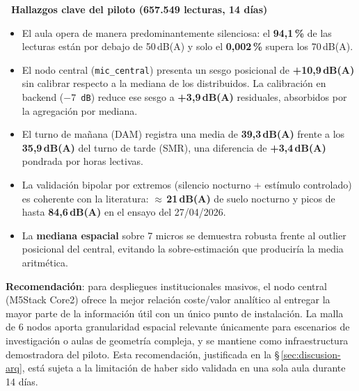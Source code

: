 \documentclass[11pt,a4paper,openany]{report}
\begin{document}
\begin{KeyFinding}
\textbf{\faChartBar\ Hallazgos clave del piloto (657.549 lecturas, 14 d\'ias)}
\begin{itemize}[leftmargin=1.2em]
    \item El aula opera de manera predominantemente silenciosa: el \textbf{94,1\,\%} de las lecturas est\'an por debajo de 50\,dB(A) y solo el \textbf{0,002\,\%} supera los 70\,dB(A).
    \item El nodo central (\texttt{mic\_central}) presenta un sesgo posicional de \textbf{+10,9\,dB(A)} sin calibrar respecto a la mediana de los distribuidos. La calibraci\'on en backend (\texttt{$-7$\,dB}) reduce ese sesgo a \textbf{+3,9\,dB(A)} residuales, absorbidos por la agregaci\'on por mediana.
    \item El turno de ma\~nana (DAM) registra una media de \textbf{39,3\,dB(A)} frente a los \textbf{35,9\,dB(A)} del turno de tarde (SMR), una diferencia de \textbf{+3,4\,dB(A)} pondrada por horas lectivas.
    \item La validaci\'on bipolar por extremos (silencio nocturno + est\'imulo controlado) es coherente con la literatura: \textbf{$\approx$\,21\,dB(A)} de suelo nocturno y picos de hasta \textbf{84,6\,dB(A)} en el ensayo del 27/04/2026.
    \item La \textbf{mediana espacial} sobre 7 micros se demuestra robusta frente al outlier posicional del central, evitando la sobre-estimaci\'on que producir\'ia la media aritm\'etica.
\end{itemize}
\end{KeyFinding}

\textbf{Recomendaci\'on}: para despliegues institucionales masivos, el nodo central (M5Stack Core2) ofrece la mejor relaci\'on coste/valor anal\'itico al entregar la mayor parte de la informaci\'on \'util con un \'unico punto de instalaci\'on. La malla de 6 nodos aporta granularidad espacial relevante \'unicamente para escenarios de investigaci\'on o aulas de geometr\'ia compleja, y se mantiene como infraestructura demostradora del piloto. Esta recomendaci\'on, justificada en la \S\,\ref{sec:discusion-arq}, est\'a sujeta a la limitaci\'on de haber sido validada en una sola aula durante 14 d\'ias.

\newpage

\tableofcontents
\newpage
\end{document}
